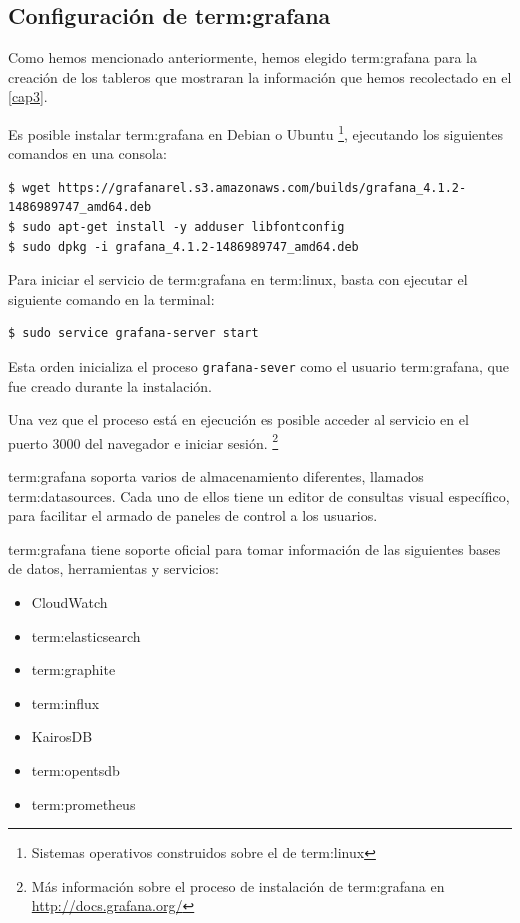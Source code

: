 \subsection{Configuración de \gls{term:grafana}}
\label{configuracion-de-grafana}

Como hemos mencionado anteriormente, hemos elegido \gls{term:grafana} para la
creación de los tableros que mostraran la información que hemos recolectado en
el \autoref{cap3}.

Es posible instalar \gls{term:grafana} en Debian o Ubuntu
\footnote{Sistemas operativos construidos sobre el  de \gls{term:linux}},
ejecutando los siguientes comandos en una consola:

\begin{lstlisting}
$ wget https://grafanarel.s3.amazonaws.com/builds/grafana_4.1.2-1486989747_amd64.deb
$ sudo apt-get install -y adduser libfontconfig
$ sudo dpkg -i grafana_4.1.2-1486989747_amd64.deb
\end{lstlisting}

Para iniciar el servicio de \gls{term:grafana} en \gls{term:linux}, basta con
ejecutar el siguiente comando en la terminal:

\begin{lstlisting}
$ sudo service grafana-server start
\end{lstlisting}


Esta orden inicializa el proceso \texttt{grafana-sever} como el usuario
\gls{term:grafana}, que fue creado durante la instalación.

Una vez que el proceso está en ejecución es posible acceder al servicio en el
puerto 3000 del navegador e iniciar sesión.
\footnote{Más información sobre el proceso de instalación de \gls{term:grafana} en
\url{http://docs.grafana.org/}}

\gls{term:grafana} soporta varios  de almacenamiento diferentes,
llamados \glspl{term:datasource}. Cada uno de ellos tiene un editor de consultas
visual específico, para facilitar el armado de paneles de control a los
usuarios.

\gls{term:grafana} tiene soporte oficial para tomar información de las
siguientes bases de datos, herramientas y servicios:

\begin{itemize}
  \item CloudWatch
  \item \gls{term:elasticsearch}
  \item \gls{term:graphite}
  \item \gls{term:influx}
  \item KairosDB
  \item \gls{term:opentsdb}
  \item \gls{term:prometheus}
\end{itemize}

